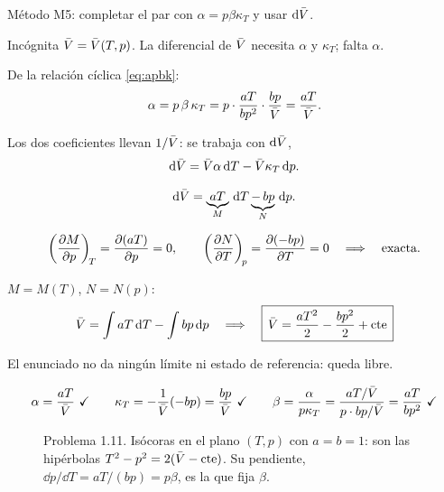 \begin{resolucion}
\idea Método M5: completar el par con $\alpha=p\beta\kappa_T$ y usar $\mathrm{d}\bar{V}$.

 Incógnita $\bar{V}=\bar{V}(T,p)$. La diferencial de $\bar{V}$ necesita $\alpha$ y
$\kappa_T$; falta $\alpha$.

 De la relación cíclica \eqref{eq:apbk}:
\[
  \alpha=p\,\beta\,\kappa_T=p\cdot\frac{aT}{bp^2}\cdot\frac{bp}{\bar{V}}=\frac{aT}{\bar{V}}.
\]

 Los dos coeficientes llevan $1/\bar{V}$: se trabaja con $\mathrm{d}\bar{V}$,
\[
  \mathrm{d}\bar{V}=\bar{V}\alpha\,\mathrm{d} T-\bar{V}\kappa_T\,\mathrm{d} p.
\]

\[
  \mathrm{d}\bar{V}=\underbrace{aT}_{M}\,\mathrm{d} T\underbrace{-\,bp}_{N}\,\mathrm{d} p.
\]

\[
  \left(\frac{\partial M}{\partial p}\right)_{\!T}=\frac{\partial(aT)}{\partial p}=0,\qquad\left(\frac{\partial N}{\partial T}\right)_{\!p}=\frac{\partial(-bp)}{\partial T}=0
  \quad\Longrightarrow\quad\text{exacta.}
\]

 $M=M(T)$, $N=N(p)$:
\[
  \bar{V}=\int aT\,\mathrm{d} T-\int bp\,\mathrm{d} p\quad\Longrightarrow\quad
  \boxed{\,\bar{V}=\frac{aT^2}{2}-\frac{bp^2}{2}+\mathrm{cte}\,}
\]

 El enunciado no da ningún límite ni estado de referencia: queda libre.

\[
  \alpha=\frac{aT}{\bar{V}}\ \checkmark\qquad\kappa_T=-\frac{1}{\bar{V}}(-bp)=\frac{bp}{\bar{V}}\ \checkmark\qquad
  \beta=\frac{\alpha}{p\kappa_T}=\frac{aT/\bar{V}}{p\cdot bp/\bar{V}}=\frac{aT}{bp^2}\ \checkmark
\]
\end{resolucion}

\begin{figure}[htbp]
\centering
{}
\caption{Problema 1.11. Isócoras en el plano $(T,p)$ con $a=b=1$: son las hipérbolas
$T^2-p^2=2(\bar{V}-\mathrm{cte})$. Su pendiente, $\dd p/\dd T=aT/(bp)=p\beta$, es la que fija $\beta$.}
\label{fig:p111}
\end{figure}

